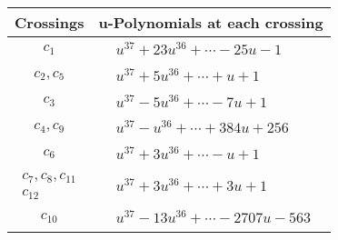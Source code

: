 \documentclass[1p]{elsarticle_modified}
\theoremstyle{definition}
\begin{document}
\begin{tabular}{m{50pt}|m{274pt}}
Crossings & \hspace{64pt}u-Polynomials at each crossing \\
\hline $$\begin{aligned}c_{1}\end{aligned}$$&$\begin{aligned}
&u^{37}+23 u^{36}+\cdots-25 u-1
\end{aligned}$\\
\hline $$\begin{aligned}c_{2},c_{5}\end{aligned}$$&$\begin{aligned}
&u^{37}+5 u^{36}+\cdots+u+1
\end{aligned}$\\
\hline $$\begin{aligned}c_{3}\end{aligned}$$&$\begin{aligned}
&u^{37}-5 u^{36}+\cdots-7 u+1
\end{aligned}$\\
\hline $$\begin{aligned}c_{4},c_{9}\end{aligned}$$&$\begin{aligned}
&u^{37}- u^{36}+\cdots+384 u+256
\end{aligned}$\\
\hline $$\begin{aligned}c_{6}\end{aligned}$$&$\begin{aligned}
&u^{37}+3 u^{36}+\cdots- u+1
\end{aligned}$\\
\hline $$\begin{aligned}c_{7},c_{8},c_{11}\\c_{12}\end{aligned}$$&$\begin{aligned}
&u^{37}+3 u^{36}+\cdots+3 u+1
\end{aligned}$\\
\hline $$\begin{aligned}c_{10}\end{aligned}$$&$\begin{aligned}
&u^{37}-13 u^{36}+\cdots-2707 u-563
\end{aligned}$\\
\hline
\end{tabular}\\~\\
\end{document}
